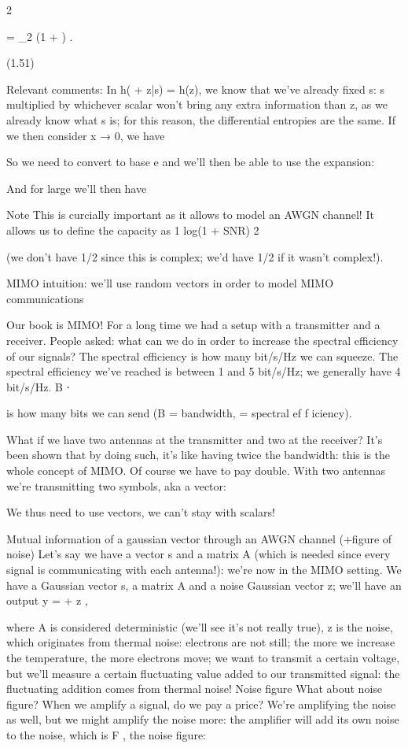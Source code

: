 2

= \log_2 (1 + \rho) .

(1.51)

Relevant comments:
In h(\sqrt{\rhos} + z|s) = h(z), we know that we've already fixed s: s multiplied by whichever scalar won't bring any extra information than z, as we already know what s is; for this reason, the differential entropies are the same.
If we then consider x → 0, we have

So we need to convert to base e and we'll then be able to use the expansion:

And for large \rho we'll then have

Note This is curcially important as it allows to model an AWGN channel! It allows us to define the capacity as 1 log(1 + SNR)
2

(we don't have 1/2 since this is complex; we'd have 1/2 if it wasn't complex!).

MIMO intuition: we'll use random vectors in order to model MIMO communications

Our book is MIMO! For a long time we had a setup with a transmitter and a receiver.
People asked: what can we do in order to increase the spectral efficiency of our signals? The spectral efficiency is how many bit/s/Hz we can squeeze.
The spectral efficiency we've reached is between 1 and 5 bit/s/Hz; we generally have 4 bit/s/Hz.
B ⋅ \nu

is how many bits we can send (B = bandwidth, \nu = spectral ef f iciency).

What if we have two antennas at the transmitter and two at the receiver? It's been shown that by doing such, it's like having twice the bandwidth: this is the whole concept of MIMO.
Of course we have to pay double.
With two antennas we're transmitting two symbols, aka a vector:

We thus need to use vectors, we can't stay with scalars!

Mutual information of a gaussian vector through an AWGN channel (+figure of noise)
Let's say we have a vector s and a matrix A (which is needed since every signal is communicating with each antenna!): we're now in the MIMO setting.
We have a Gaussian vector s, a matrix A and a noise Gaussian vector z; we'll have an output y = \sqrt{\rhoAs} + z ,

where A is considered deterministic (we'll see it's not really true), z is the noise,
which originates from thermal noise: electrons are not still; the more we increase the temperature, the more electrons move; we want to transmit a certain voltage, but we'll measure a certain fluctuating value added to our transmitted signal: the fluctuating addition comes from thermal noise!
Noise figure What about noise figure?
When we amplify a signal, do we pay a price? We're amplifying the noise as well,
but we might amplify the noise more: the amplifier will add its own noise to the noise, which is F , the noise figure:

